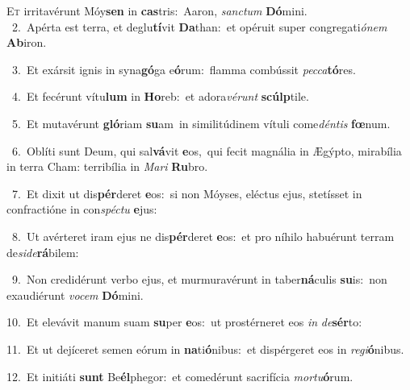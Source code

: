 \lettrine{\initial\textcolor{\initialcolor}{E}}{t} irritavérunt Móy\textbf{sen} in \textbf{cas}\-tris:~\star Aaron, \textit{sanc}\-\textit{tum} \textbf{Dó}\-mini.\\
{\numbfont\textcolor{\numbcolor}{~2.}}~Apérta est terra, et deglu\-\textbf{tí}\-vit \textbf{Da}\-than:~\star et opéruit super congregati\-\textit{ó}\-\textit{nem} \textbf{Ab}\-iron.\par
{\numbfont\textcolor{\numbcolor}{~3.}}~Et exársit ignis in syna\-\textbf{gó}\-ga e\-\textbf{ó}\-rum:~\star flamma combússit \textit{pec}\-\textit{ca}\textbf{tó}res.\par
{\numbfont\textcolor{\numbcolor}{~4.}}~Et fecérunt vítu\textbf{lum} in \textbf{Ho}\-reb:~\star et adora\-\textit{vé}\-\textit{runt} \textbf{scúlp}\-tile.\par
{\numbfont\textcolor{\numbcolor}{~5.}}~Et mutavérunt \textbf{gló}\-riam \textbf{su}\-am~\star in similitúdinem vítuli come\-\textit{dén}\-\textit{tis} \textbf{fœ}\-num.\par
{\numbfont\textcolor{\numbcolor}{~6.}}~Oblíti sunt Deum, qui sal\-\textbf{vá}\-vit \textbf{e}\-os,~\star qui fecit magnália in Ægýpto, mirabília in terra Cham: terribília in \textit{Ma}\-\textit{ri} \textbf{Ru}\-bro.\par
{\numbfont\textcolor{\numbcolor}{~7.}}~Et dixit ut dis\-\textbf{pér}\-deret \textbf{e}\-os:~\star si non Móyses, eléctus ejus, stetísset in confractióne in con\-\textit{spéc}\-\textit{tu} \textbf{e}\-jus:\par
{\numbfont\textcolor{\numbcolor}{~8.}}~Ut avérteret iram ejus ne dis\-\textbf{pér}\-deret \textbf{e}\-os:~\star et pro níhilo habuérunt terram de\-\textit{si}\-\textit{de}\textbf{rá}bilem:\par
{\numbfont\textcolor{\numbcolor}{~9.}}~Non credidérunt verbo ejus, et murmuravérunt in taber\-\textbf{ná}\-culis \textbf{su}\-is:~\star non exaudiérunt \textit{vo}\-\textit{cem} \textbf{Dó}\-mini.\par
{\numbfont\textcolor{\numbcolor}{10.}}~Et elevávit manum suam \textbf{su}\-per \textbf{e}\-os:~\star ut prostérneret eos \textit{in} \textit{de}\-\textbf{sér}to:\par
{\numbfont\textcolor{\numbcolor}{11.}}~Et ut dejíceret semen eórum in \textbf{na}\-ti\-\textbf{ó}\-nibus:~\star et dispérgeret eos in \textit{re}\-\textit{gi}\textbf{ó}nibus.\par
{\numbfont\textcolor{\numbcolor}{12.}}~Et initiáti \textbf{sunt} Be\-\textbf{él}\-phegor:~\star et comedérunt sacrifícia \textit{mor}\-\textit{tu}\textbf{ó}rum.\par
